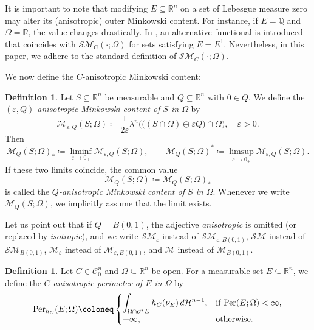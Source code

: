 \documentclass[pdflatex,sn-mathphys-num]{sn-jnl}
\theoremstyle{plain}
\theoremstyle{definition}
\newtheorem{definition}[theorem]{Definition}
\DeclareMathOperator{\Per}{\textup{Per}}
\begin{document}
It is important to note that modifying $E \subseteq \mathbb{R}^n$ on a set of Lebesgue measure zero may alter its (anisotropic) outer Minkowski content.  
For instance, if $E = \mathbb{Q}$ and $\Omega = \mathbb{R}$, the value changes drastically.  
In \cite{chambolle}, an alternative functional is introduced that coincides with $\mathcal{SM}_C(\cdot; \Omega)$ for sets satisfying $E = E^1$.  
Nevertheless, in this paper, we adhere to the standard definition of $\mathcal{SM}_C(\cdot; \Omega)$.

We now define the $C$-anisotropic Minkowski content:

\begin{definition}\label{Minkow}
Let $S \subseteq \mathbb{R}^n$ be measurable and $Q \subseteq \mathbb{R}^n$ with $0 \in Q$.  
We define the \textit{$(\varepsilon, Q)$-anisotropic Minkowski content of $S$ in $\Omega$} by
\[
\mathcal{M}_{\varepsilon, Q}(S; \Omega)
    \coloneq \frac{1}{2\varepsilon}
    \lambda^n\!\Big( \big( (S \cap \Omega) \oplus \varepsilon Q \big) \cap \Omega \Big),
    \quad \varepsilon > 0.
\]
Then
\[
\mathcal{M}_Q(S; \Omega)_* \coloneq \liminf_{\varepsilon \to 0_+} \mathcal{M}_{\varepsilon, Q}(S; \Omega),
\qquad
\mathcal{M}_Q(S; \Omega)^* \coloneq \limsup_{\varepsilon \to 0_+} \mathcal{M}_{\varepsilon, Q}(S; \Omega).
\]
If these two limits coincide, the common value
\[
\mathcal{M}_Q(S; \Omega) \coloneq \mathcal{M}_Q(S; \Omega)_*
\]
is called the \textit{$Q$-anisotropic Minkowski content of $S$ in $\Omega$}.  
Whenever we write $\mathcal{M}_Q(S; \Omega)$, we implicitly assume that the limit exists.
\end{definition}
Let us point out that if $Q=B(0,1)$, the adjective \textit{anisotropic} is omitted (or replaced by \textit{isotropic}), and we write $\mathcal{SM}_{\varepsilon}$ instead of $\mathcal{SM}_{\varepsilon, B(0,1)}$, $\mathcal{SM}$ instead of $\mathcal{SM}_{B(0,1)}$, $\mathcal{M}_{\varepsilon}$ instead of $\mathcal{M}_{\varepsilon, B(0,1)}$, and $\mathcal{M}$ instead of $\mathcal{M}_{B(0,1)}$.    

\begin{definition}
Let $C\in\mathcal{C}^n_0$ and $\Omega\subseteq\mathbb{R}^n$ be open. For a measurable set $E\subseteq\mathbb{R}^n$, we define the \textit{$C$-anisotropic perimeter of $E$ in $\Omega$} by
\[
\textup{Per}_{h_C}(E;\Omega)\coloneq
\begin{cases}
\displaystyle \int_{\Omega\cap \partial^* E} h_C(\nu_E)\, d\mathcal{H}^{n-1}, & \text{if $\Per(E;\Omega)<\infty$},\\
+\infty, & \text{otherwise}.
\end{cases}
\]
\end{definition}
\end{document}
